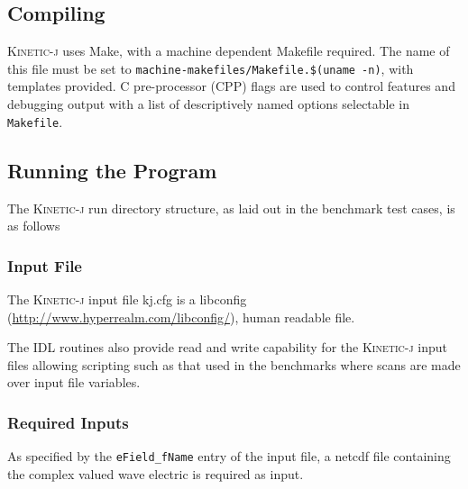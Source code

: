 \documentclass[final,5p,times,twocolumn]{elsarticle}
\newcommand{\kj}{\textsc{Kinetic-j}\xspace}
\begin{document}
\subsection{Compiling}
\label{section:compiling}
%
\kj uses Make, with a machine dependent Makefile required. The name of this file must be set to \texttt{machine-makefiles/Makefile.\$(uname -n)}, with templates provided. C pre-processor (CPP) flags are used to control features and debugging output with a list of descriptively named options selectable in \texttt{Makefile}. 

\subsection{Running the Program}
\label{section:running}
%
The \kj run directory structure, as laid out in the benchmark test cases, is as follows

\subsubsection{Input File}
\label{section:input_file}
The \kj input file kj.cfg is a libconfig (\url{http://www.hyperrealm.com/libconfig/}), human readable file. 
%
 
%
The IDL routines also provide read and write capability for the \kj input files allowing scripting such as that used in the benchmarks where scans are made over input file variables.  
%
\subsubsection{Required Inputs}
\label{section:inputs}
As specified by the \lstinline{eField_fName} entry of the input file, a netcdf file containing the complex valued wave electric is required as input. 
 
%
\end{document}
